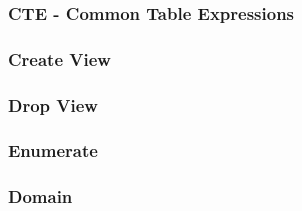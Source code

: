 \begin{multicols}{2}
        \subsubsection{CTE - Common Table Expressions}
            
        \subsubsection{Create View}
            
        \subsubsection{Drop View}
            
        \subsubsection{Enumerate}
            
        \subsubsection{Domain}
            
    \end{multicols}
